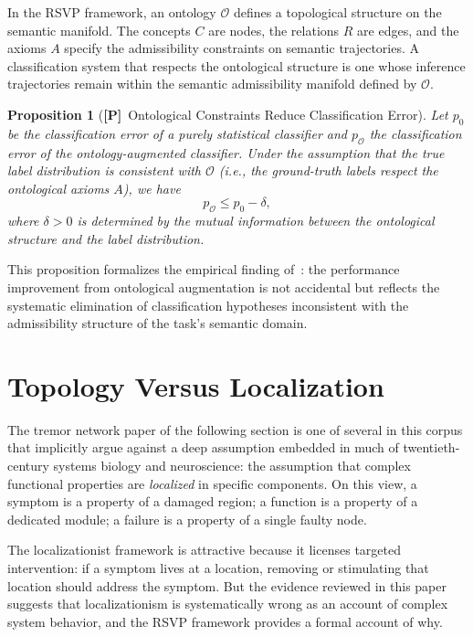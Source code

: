 \documentclass[11pt, oneside]{article}
\numberwithin{equation}{section}
\newcommand{\ClaimP}{\textcolor{rsvpgray!70}{\textbf{[P]}}}
\theoremstyle{rsvpstyle}
\newtheorem{proposition}[theorem]{Proposition}
\theoremstyle{remark}
\begin{document}
In the RSVP framework, an ontology $\mathcal{O}$ defines a topological structure on
the semantic manifold. The concepts $C$ are nodes, the relations $R$ are edges, and
the axioms $A$ specify the admissibility constraints on semantic trajectories. A
classification system that respects the ontological structure is one whose inference
trajectories remain within the semantic admissibility manifold defined by $\mathcal{O}$.

\begin{proposition}[\ClaimP\ Ontological Constraints Reduce Classification Error]
Let $p_0$ be the classification error of a purely statistical classifier and $p_\mathcal{O}$
the classification error of the ontology-augmented classifier. Under the assumption that
the true label distribution is consistent with $\mathcal{O}$ (i.e., the ground-truth
labels respect the ontological axioms $A$), we have
\begin{equation}
  p_\mathcal{O} \leq p_0 - \delta,
\end{equation}
where $\delta > 0$ is determined by the mutual information between the ontological
structure and the label distribution.
\end{proposition}

This proposition formalizes the empirical finding of~\cite{Taye2026Amharic}: the
performance improvement from ontological augmentation is not accidental but reflects
the systematic elimination of classification hypotheses inconsistent with the
admissibility structure of the task's semantic domain.

\section{Topology Versus Localization}
\label{sec:topovslocal}

The tremor network paper of the following section is one of several in this corpus
that implicitly argue against a deep assumption embedded in much of twentieth-century
systems biology and neuroscience: the assumption that complex functional properties
are \emph{localized} in specific components. On this view, a symptom is a property
of a damaged region; a function is a property of a dedicated module; a failure is a
property of a single faulty node.

The localizationist framework is attractive because it licenses targeted intervention:
if a symptom lives at a location, removing or stimulating that location should
address the symptom. But the evidence reviewed in this paper suggests that
localizationism is systematically wrong as an account of complex system behavior,
and the RSVP framework provides a formal account of why.
\end{document}
